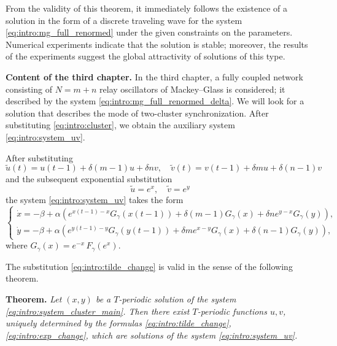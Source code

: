 From the validity of this theorem, it immediately follows the existence of a solution in the form of a discrete traveling wave for the system \eqref{eq:intro:mg_full_renormed} under the given constraints on the parameters. Numerical experiments indicate that the solution is stable; moreover, the results of the experiments suggest the global attractivity of solutions of this type.

\bigskip

\textbf{Content of the third chapter.} In the third chapter, a fully coupled network consisting of $N = m + n$ relay oscillators of Mackey--Glass is considered; it described by the system \eqref{eq:intro:mg_full_renormed_delta}. We will look for a solution that describes the mode of two-cluster synchronization. After substituting \eqref{eq:intro:cluster}, we obtain the auxiliary system \eqref{eq:intro:system_uv}.

After substituting
\begin{equation}
	\label{eq:intro:tilde_change}
	\tilde{u}(t) = u(t - 1) + \delta (m - 1) u + \delta n v, \quad \tilde{v}(t) = v(t - 1) + \delta m u + \delta (n - 1) v
\end{equation}
%
and the subsequent exponential substitution
\begin{equation}
	\label{eq:intro:exp_change}
	\tilde{u} = e^x, \quad \tilde{v} = e^y
\end{equation}
%
the system \eqref{eq:intro:system_uv} takes the form
%
\begin{equation}
	\label{eq:intro:system_cluster_main}
	\begin{cases}
		\dot{x} = -\beta + \alpha \left(e^{x(t - 1) - x} G_{\gamma} (x(t - 1)) + \delta (m - 1) G_{\gamma} (x) + \delta n e^{y - x} G_{\gamma} (y)\right),\\
		\dot{y} = -\beta + \alpha \left(e^{y(t - 1) - y} G_{\gamma} (y(t - 1)) + \delta m e^{x - y} G_{\gamma} (x) + \delta (n - 1) G_{\gamma} (y)\right),
	\end{cases}
\end{equation}
where $G_{\gamma} (x) = e^{-x} \, F_{\gamma} (e^x)$.

The substitution \eqref{eq:intro:tilde_change} is valid in the sense of the following theorem.

\textbf{Theorem.} \textit{Let $(x, y)$ be a $T$-periodic solution of the system \eqref{eq:intro:system_cluster_main}. Then there exist $T$-periodic functions $u, v$, uniquely determined by the formulas \eqref{eq:intro:tilde_change}, \eqref{eq:intro:exp_change}, which are solutions of the system \eqref{eq:intro:system_uv}.}

